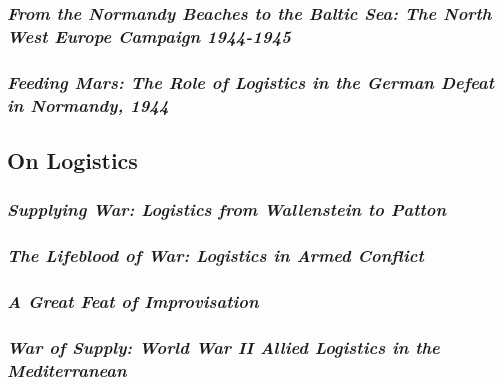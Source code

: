 \documentclass[noraggedright]{turabian-researchpaper}
\begin{document}
		\subsubsection{\textit{From the Normandy Beaches to the 
			Baltic Sea: The North West Europe Campaign
			1944-1945}}
		\subsubsection{\textit{Feeding Mars:  The Role of Logistics
			in the German Defeat in Normandy, 1944}}

	\subsection{On Logistics}


		\subsubsection{\textit{Supplying War:  Logistics from
			Wallenstein to Patton}}
		\subsubsection{\textit{The Lifeblood of War: Logistics in
			Armed Conflict}}
		\subsubsection{\textit{A Great Feat of Improvisation}}


		\subsubsection{\textit{War of Supply:  World War II Allied
			Logistics in the Mediterranean}}
\end{document}
